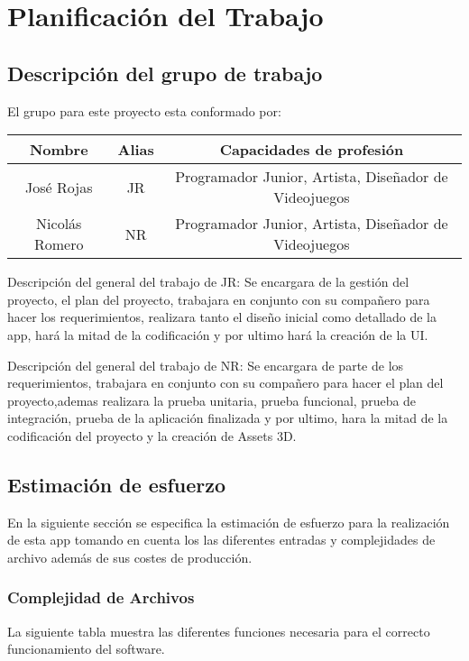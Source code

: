 \section{Planificación del Trabajo}

\subsection{Descripción del grupo de trabajo}
El grupo para este proyecto esta conformado por:

\begin{tabular}{|c|c|c|}
\hline 
Nombre & Alias & Capacidades de profesión \\ 
\hline 
José Rojas & JR & Programador Junior, Artista, Diseñador de Videojuegos \\ 
\hline 
Nicolás Romero & NR & Programador Junior, Artista, Diseñador de Videojuegos \\ 
\hline 
\end{tabular} 

Descripción del general del trabajo de JR: Se encargara de la gestión del proyecto, el
plan del proyecto, trabajara en conjunto con su compañero para hacer los requerimientos,
realizara tanto el diseño inicial como detallado de la app, hará la mitad de la codificación y por ultimo hará la creación de la UI.

Descripción del general del trabajo de NR: Se encargara de parte de los requerimientos,
trabajara en conjunto con su compañero para hacer el plan del proyecto,ademas realizara la
prueba unitaria, prueba funcional, prueba de integración, prueba de la aplicación finalizada
y por ultimo, hara la mitad de la codificación del proyecto y la creación de Assets 3D.


\subsection{Estimación de esfuerzo}
En la siguiente sección se especifica la estimación de esfuerzo para la realización de esta app tomando en cuenta los las diferentes entradas y complejidades de archivo además de sus costes de producción.

\subsubsection{Complejidad de Archivos}
La siguiente tabla muestra las diferentes funciones necesaria para el correcto funcionamiento del software.

